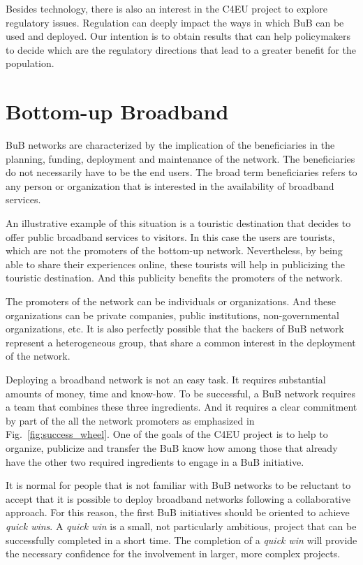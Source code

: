 \documentclass[conference]{IEEEtran}
\begin{document}
Besides technology, there is also an interest in the C4EU project to explore regulatory issues.
Regulation can deeply impact the ways in which BuB can be used and deployed.
Our intention is to obtain results that can help policymakers to decide which are the regulatory directions that lead to a greater benefit for the population.

\section{Bottom-up Broadband}
\label{sec:bub}

BuB networks are characterized by the implication of the beneficiaries in the planning, funding, deployment and maintenance of the network.
The beneficiaries do not necessarily have to be the end users.
The broad term beneficiaries refers to any person or organization that is interested in the availability of broadband services.

An illustrative example of this situation is a touristic destination that decides to offer public broadband services to visitors.
In this case the users are tourists, which are not the promoters of the bottom-up network.
Nevertheless, by being able to share their experiences online, these tourists will help in publicizing the touristic destination.
And this publicity benefits the promoters of the network.

The promoters of the network can be individuals or organizations.
And these organizations can be private companies, public institutions, non-governmental organizations, etc.  
It is also perfectly possible that the backers of BuB network represent a heterogeneous group, that share a common interest in the deployment of the network.

Deploying a broadband network is not an easy task.
It requires substantial amounts of money, time and know-how.
To be successful, a BuB network requires a team that combines these three ingredients.
And it requires a clear commitment by part of the all the network promoters as emphasized in Fig.~\ref{fig:success_wheel}.
One of the goals of the C4EU project is to help to organize, publicize and transfer the  BuB know how among those that already have the other two required ingredients to engage in a BuB initiative.

It is normal for people that is not familiar with BuB networks to be reluctant to accept that it is possible to deploy broadband networks following a collaborative approach.
For this reason, the first BuB initiatives should be oriented to achieve \emph{quick wins}.
A \emph{quick win} is a small, not particularly ambitious, project that can be successfully completed in a short time.
The completion of a \emph{quick win} will provide the necessary confidence for the involvement in larger, more complex projects.
\end{document}
